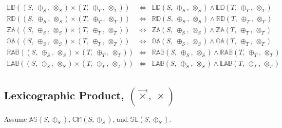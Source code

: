 \documentclass[10pt]{article}
\newcommand{\propname}[1]{{\mathbb{#1}}}
\begin{document}
\[
\begin{array}{rcl} 
\propname{LD}((S,\ \oplus_S,\ \otimes_S) \times (T,\ \oplus_T,\ \otimes_T)) 
   & \Leftrightarrow %
   & \propname{LD}(S,\ \oplus_S,\ \otimes_S) \wedge \propname{LD}(T,\ \oplus_T,\ \otimes_T)\\ 
\propname{RD}((S,\ \oplus_S,\ \otimes_S) \times (T,\ \oplus_T,\ \otimes_T)) 
   & \Leftrightarrow %
   & \propname{RD}(S,\ \oplus_S,\ \otimes_S) \wedge \propname{RD}(T,\ \oplus_T,\ \otimes_T) 
  \\ 
\propname{ZA}((S,\ \oplus_S,\ \otimes_S) \times (T,\ \oplus_T,\ \otimes_T)) 
    & \Leftrightarrow %
    & \propname{ZA}(S,\ \oplus_S,\ \otimes_S) \wedge \propname{ZA}(T,\ \oplus_T,\ \otimes_T)
   \\
\propname{OA}((S,\ \oplus_S,\ \otimes_S) \times (T,\ \oplus_T,\ \otimes_T)) 
    & \Leftrightarrow %
    & \propname{OA}(S,\ \oplus_S,\ \otimes_S) \wedge \propname{OA}(T,\ \oplus_T,\ \otimes_T)
   \\
\propname{RAB}((S,\ \oplus_S,\ \otimes_S) \times (T,\ \oplus_T,\ \otimes_T)) 
    & \Leftrightarrow %
    & \propname{RAB}(S,\ \oplus_S,\ \otimes_S) \wedge  \propname{RAB}(T,\ \oplus_T,\ \otimes_T) 
    \\ 
\propname{LAB}((S,\ \oplus_S,\ \otimes_S) \times (T,\ \oplus_T,\ \otimes_T)) 
    & \Leftrightarrow %
    & \propname{LAB}(S,\ \oplus_S,\ \otimes_S) \wedge \propname{LAB}(T,\ \oplus_T,\ \otimes_T)
    \\ 
\end{array} 
\]

\subsection{Lexicographic Product, $(\vec{\times},\ \times)$} 

Assume 
$\propname{AS}(S, \oplus_S)$, 
$\propname{CM}(S, \oplus_S)$,  and 
$\propname{SL}(S, \oplus_S)$. 
\end{document}
